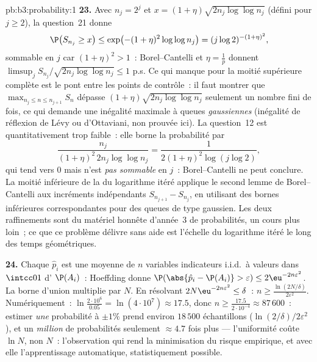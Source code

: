 \begin{solution}{pb:b3:probability:1}
\textbf{23.} Avec $n_j = 2^j$ et $x = (1 +
\eta)\sqrt{2n_j\log\log n_j}$ (défini pour $j \geq 2$), la
question~21 donne
\[
\P\bigl(S_{n_j} \geq x\bigr) \leq \exp\bigl(-(1 +
\eta)^2\log\log n_j\bigr) = (j\log 2)^{-(1+\eta)^2},
\]
sommable en $j$ car $(1 + \eta)^2 > 1$~: Borel--Cantelli et
$\eta = \frac1p$ donnent $\limsup_jS_{n_j}/\sqrt{2n_j
\log\log n_j} \leq 1$ p.s. Ce qui manque pour la moitié
supérieure complète est le pont entre les points de
contrôle~: il faut montrer que $\max_{n_j\leq n\leq
n_{j+1}}S_n$ dépasse $(1+\eta)\sqrt{2n_j\log\log n_j}$
seulement un nombre fini de fois, ce qui demande une
inégalité maximale à queues \emph{gaussiennes}
(inégalité de réflexion de Lévy ou d'Ottaviani, non
prouvée ici). La question~12 est quantitativement trop
faible~: elle borne la probabilité par
\[
\frac{n_j}{(1+\eta)^2\,2n_j\log\log n_j}
= \frac{1}{2(1+\eta)^2\log(j\log2)},
\]
qui tend vers $0$ mais n'est \emph{pas sommable} en $j$~:
Borel--Cantelli ne peut conclure. La moitié inférieure de
la  du logarithme itéré applique le second lemme de
Borel--Cantelli aux incréments indépendants $S_{n_{j+1}} -
S_{n_j}$, en utilisant des bornes inférieures
correspondantes pour des queues de type gaussien. Les
deux raffinements sont du matériel honnête d'année~3 de
probabilités, un cours plus loin~; ce que ce problème
délivre sans aide est l'échelle  du logarithme
itéré le long des temps géométriques.

\textbf{24.} Chaque $\hat p_i$ est une moyenne de $n$
variables indicateurs i.i.d.\ à valeurs dans $\intcc01$
d' $\P(A_i)$~: Hoeffding donne $\P(\abs{\hat p_i
- \P(A_i)} > \varepsilon) \leq 2\eu^{-2n\varepsilon^2}$.
La borne d'union multiplie par $N$. En résolvant
$2N\eu^{-2n\varepsilon^2} \leq \delta$~: $n \geq
\frac{\ln(2N/\delta)}{2\varepsilon^2}$. Numériquement~:
$\ln\frac{2\cdot10^6}{0.05} = \ln(4\cdot10^7) \approx
17.5$, donc $n \geq \frac{17.5}{2\cdot10^{-4}} \approx
87\,600$~: estimer \emph{une} probabilité à $\pm1\%$
prend environ $18\,500$ échantillons
($\ln(2/\delta)/2\varepsilon^2$), et un \emph{million} de
probabilités seulement $\approx 4.7$ fois plus ---
l'uniformité coûte $\ln N$, non $N$~: l'observation qui
rend la minimisation du risque empirique, et avec elle
l'apprentissage automatique, statistiquement possible.


\end{solution}
